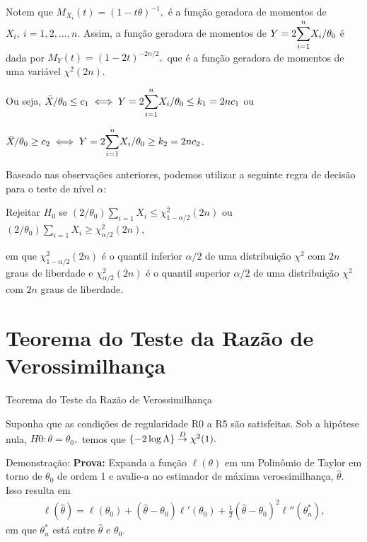 \documentclass[12pt]{beamer}
\begin{document}
\begin{frame}{}
\begin{block}{}
\justifying
Notem que $M_{X_{i}}(t)=(1-t\theta)^{-1},$ é a função geradora de momentos de $X_{i},~i=1,2,\ldots,n.$ Assim, a função geradora de momentos de $Y=2{\displaystyle \sum_{i=1}^{n}} X_{i}/\theta_0$ é dada por $M_{Y}(t)=(1-2t)^{-2n/2},$ que é a função geradora de momentos de uma variável $\chi^{2}(2n).$
\end{block}
\pause
\begin{block}{}
\justifying
Ou seja, $\Bar{X}/\theta_0 \leq c_1\iff Y=2{\displaystyle \sum_{i=1}^{n}} X_{i}/\theta_0\leq k_{1}=2nc_{1}$ ou 
\end{block}
\pause
\begin{block}{}
\justifying
$\Bar{X}/\theta_0 \geq c_2\iff Y=2{\displaystyle \sum_{i=1}^{n}} X_{i}/\theta_0\geq k_{2}=2nc_{2}$.
\end{block}
\end{frame}

\begin{frame}{}
\begin{block}{}
\justifying
Baseado nas observações anteriores, podemos utilizar a seguinte regra de decisão para o teste de nível $\alpha$:
\end{block}
\pause
\begin{block}{}
\justifying
Rejeitar $H_0$ se $(2/\theta_0) \sum_{i=1} X_i \leq \chi^2_{1-\alpha/2}(2n)$ ou $(2/\theta_0) \sum_{i=1} X_i \geq \chi^2_{\alpha/2}(2n),$
\end{block}
\begin{block}{}
\justifying
em que $\chi^2_{1-\alpha/2}(2n)$ é o quantil inferior $\alpha/2$ de uma distribuição $\chi^2$ com $2n$ graus de liberdade e $\chi^2_{\alpha/2}(2n)$ é o quantil superior $\alpha/2$ de uma distribuição $\chi^2$ com $2n$ graus de liberdade.
\end{block}
\end{frame}


\section{Teorema do Teste da Razão de Verossimilhança}
\begin{frame}{Teorema do Teste da Razão de Verossimilhança}
\begin{Teorema}
\justifying
Suponha que as condições de regularidade R0 a R5 são satisfeitas. Sob a hipótese nula, $H0: \theta = \theta_0,$ temos que $\{-2 \log \Lambda\} \overset{D}{\rightarrow} \chi^2(1).$
\end{Teorema}
\pause
\begin{block}{Demonstração:}
\justifying
\textbf{Prova:} Expanda a função $\ell(\theta)$ em um Polinômio de Taylor em torno de $\theta_0$ de ordem 1 e avalie-a no estimador de máxima verossimilhança, $\hat{\theta}$. Isso resulta em
\begin{align}\label{6.3.8}
    \ell(\hat{\theta}) = \ell(\theta_{0}) + (\hat{\theta} - \theta_0)\ell'(\theta_{0}) + \frac{1}{2}(\hat{\theta} - \theta_0)^2 \ell''(\theta^{*}_{n}),
\end{align}
em que $\theta^*_n$ está entre $\hat{\theta}$ e $\theta_0.$
\end{block}
\end{frame}
\end{document}
